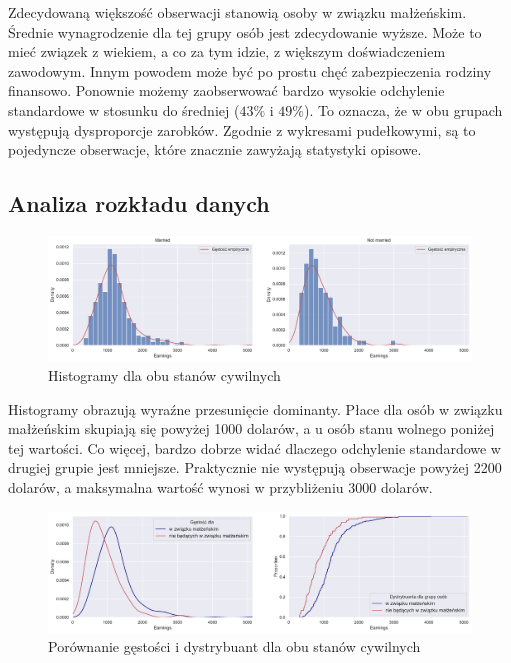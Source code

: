 \documentclass[12pt]{mwart}
\begin{document}
\noindent Zdecydowaną większość obserwacji stanowią osoby w związku małżeńskim. Średnie wynagrodzenie dla tej grupy osób jest zdecydowanie wyższe. Może to mieć związek z wiekiem, a co za tym idzie, z większym doświadczeniem zawodowym. Innym powodem może być po prostu chęć zabezpieczenia rodziny finansowo. Ponownie możemy zaobserwować bardzo wysokie odchylenie standardowe w stosunku do średniej ($ 43\%$ i $49 \% $). To oznacza, że w obu grupach występują dysproporcje zarobków. Zgodnie z wykresami pudełkowymi, są to pojedyncze obserwacje, które znacznie zawyżają statystyki opisowe. 




\subsection{Analiza rozkładu danych}

\begin{figure}[H]
	\begin{center}
	\includegraphics[scale=0.37]{histogramy2.pdf}
	\caption{Histogramy dla obu stanów cywilnych}
	\end{center}
\end{figure}

\noindent Histogramy obrazują wyraźne przesunięcie dominanty. Płace dla osób w związku małżeńskim skupiają się powyżej 1000 dolarów, a u osób stanu wolnego poniżej tej wartości. Co więcej, bardzo dobrze widać dlaczego odchylenie standardowe w drugiej grupie jest mniejsze. Praktycznie nie występują obserwacje powyżej 2200 dolarów, a maksymalna wartość wynosi w przybliżeniu 3000 dolarów.

\begin{figure}[H]
	\begin{center}
	\includegraphics[scale=0.37]{gd2.pdf}
	\caption{Porównanie gęstości i dystrybuant dla obu stanów cywilnych}
	\end{center}
\end{figure}
\end{document}
